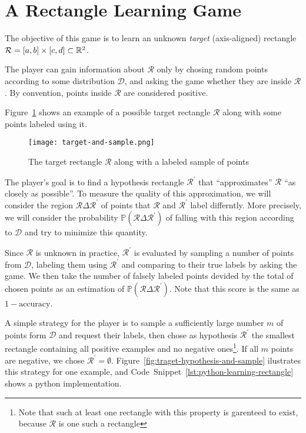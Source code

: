 \section{A Rectangle Learning Game}
\newcommand{\rectangle}{\mathcal{R}}
The objective of this game is to learn an unknown \emph{target} (axis-aligned) rectangle \(\rectangle = [a, b] \times [c, d] \subset \reals^2\).

The player can gain information about \(\rectangle\) only by chosing random points according to some distribution \(\mathcal{D}\), and asking the game whether they are inside \(\rectangle\). By convention, points inside \(\rectangle\) are considered positive.

Figure~\ref{fig:traget-and-sample} shows an example of a possible target rectangle \(\rectangle\) along with some points labeled using it.

\begin{figure}
    \begin{center}
        \texttt{[image: target-and-sample.png]}  
    \end{center}
    \caption{The target rectangle \(\rectangle\) along with a labeled sample of points}
    \label{fig:traget-and-sample}
\end{figure}

The player's goal is to find a hypothesis rectangle \(\rectangle^\prime\) that ``approximates'' \(\rectangle\) ``as closely as possible''. To measure the quality of this approximation, we will consider the region \(\rectangle\Delta\rectangle^\prime\) of points that \(\rectangle\) and \(\rectangle^\prime\) label differntly. More precisely, we will consider the probability \(\mathbb{P}(\rectangle\Delta\rectangle^\prime)\) of falling with this region according to \(\mathcal{D}\) and try to minimize this quantity.

Since \(\rectangle\) is unknown in practice, \(\rectangle^\prime\) is evaluated by sampling a number of points from \(\mathcal{D}\), labeling them using \(\rectangle^\prime\) and comparing to their true labels by asking the game. We then take the number of falsely labeled points devided by the total of chosen points as an estimation of \(\mathbb{P}(\rectangle\Delta\rectangle^\prime)\).
Note that this score is the same as \(1 - \mathrm{accuracy}\).

A simple strategy for the player is to sample a sufficiently large number \(m\) of points form \(\mathcal{D}\) and request their labels, then chose as hypothesis \(\rectangle^\prime\) the smallest rectangle containing all positive examples and no negative ones\footnote{Note that such at least one rectangle with this property is garenteed to exist, because \(\rectangle\) is one such a rectangle}. If all \(m\) points are negative, we chose \(\rectangle^\prime = \emptyset\). Figure~\ref{fig:traget-hypothesis-and-sample} ilustrates this strategy for one example, and Code~Snippet~\ref{lst:python-learning-rectangle} shows a python implementation.


